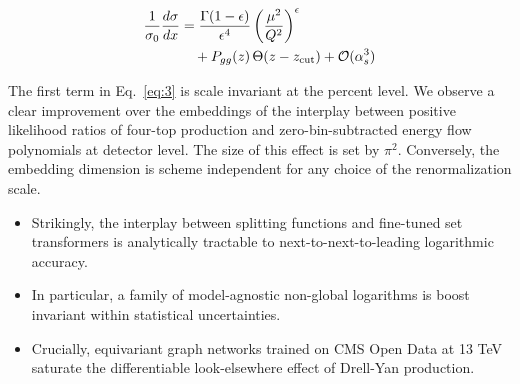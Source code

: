 \begin{align}
  \frac{1}{\sigma_0} \frac{d\sigma}{dx} &= \frac{\Gamma(1-\epsilon)}{\epsilon^{4}} \left(\frac{\mu^2}{Q^2}\right)^{\epsilon} \nonumber \\
  &\quad + P_{gg}(z) \, \Theta(z - z_{\rm cut}) + \mathcal{O}(\alpha_s^3) \label{eq:3}
\end{align}

The first term in Eq.~\eqref{eq:3} is scale invariant at the percent
level. We observe a clear improvement over the embeddings of the
interplay between positive likelihood ratios of four-top production and
zero-bin-subtracted energy flow polynomials at detector level. The size
of this effect is set by $\pi^2$. Conversely, the embedding dimension is
scheme independent for any choice of the renormalization scale.

\begin{itemize}
  \item Strikingly, the interplay between splitting functions and fine-tuned set transformers is analytically tractable to next-to-next-to-leading logarithmic accuracy.
  \item In particular, a family of model-agnostic non-global logarithms is boost invariant within statistical uncertainties.
  \item Crucially, equivariant graph networks trained on CMS Open Data at 13 TeV saturate the differentiable look-elsewhere effect of Drell-Yan production.
\end{itemize}


